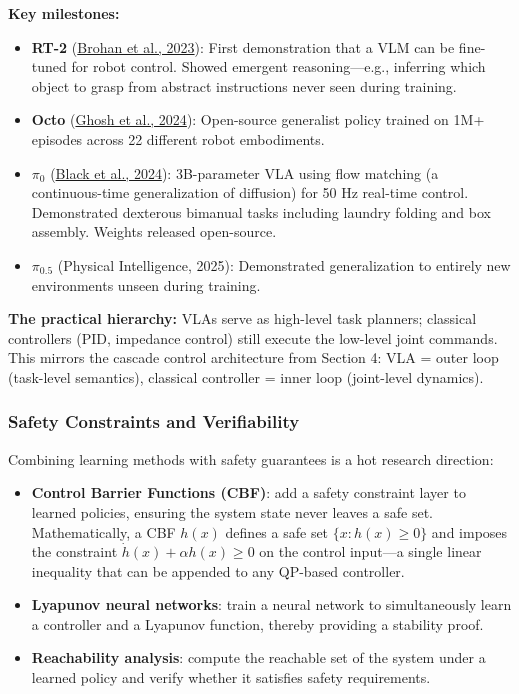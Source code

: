 \textbf{Key milestones:}
\begin{itemize}[nosep]
    \item \textbf{RT-2} (\href{https://arxiv.org/abs/2307.15818}{Brohan et al., 2023}): First demonstration that a VLM can be fine-tuned for robot control. Showed emergent reasoning---e.g., inferring which object to grasp from abstract instructions never seen during training.
    \item \textbf{Octo} (\href{https://arxiv.org/abs/2405.12213}{Ghosh et al., 2024}): Open-source generalist policy trained on 1M+ episodes across 22 different robot embodiments.
    \item \textbf{$\pi_0$} (\href{https://arxiv.org/abs/2410.24164}{Black et al., 2024}): 3B-parameter VLA using flow matching (a continuous-time generalization of diffusion) for 50 Hz real-time control. Demonstrated dexterous bimanual tasks including laundry folding and box assembly. Weights released open-source.
    \item \textbf{$\pi_{0.5}$} (Physical Intelligence, 2025): Demonstrated generalization to entirely new environments unseen during training.
\end{itemize}

\textbf{The practical hierarchy:} VLAs serve as high-level task planners; classical controllers (PID, impedance control) still execute the low-level joint commands. This mirrors the cascade control architecture from Section 4: VLA = outer loop (task-level semantics), classical controller = inner loop (joint-level dynamics).

\subsubsection{Safety Constraints and Verifiability}

Combining learning methods with safety guarantees is a hot research direction:
\begin{itemize}[nosep]
    \item \textbf{Control Barrier Functions (CBF)}: add a safety constraint layer to learned policies, ensuring the system state never leaves a safe set. Mathematically, a CBF $h(x)$ defines a safe set $\{x : h(x) \geq 0\}$ and imposes the constraint $\dot{h}(x) + \alpha h(x) \geq 0$ on the control input---a single linear inequality that can be appended to any QP-based controller.
    \item \textbf{Lyapunov neural networks}: train a neural network to simultaneously learn a controller and a Lyapunov function, thereby providing a stability proof.
    \item \textbf{Reachability analysis}: compute the reachable set of the system under a learned policy and verify whether it satisfies safety requirements.
\end{itemize}

